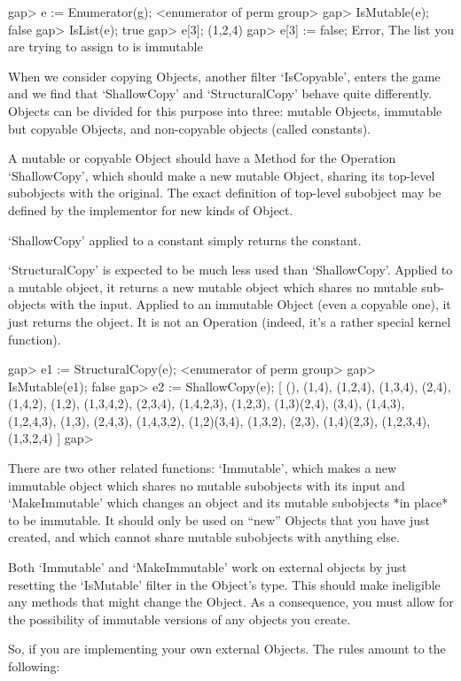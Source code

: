 \beginexample
gap> e := Enumerator(g);
<enumerator of perm group>
gap> IsMutable(e);
false
gap> IsList(e);
true
gap> e[3];
(1,2,4)
gap> e[3] := false;
Error, The list you are trying to assign to is immutable
\endexample

When we consider copying Objects, another filter `IsCopyable', enters
the game and we find that `ShallowCopy' and `StructuralCopy' behave quite
differently. Objects can be divided for this purpose into three:
mutable Objects, immutable but copyable Objects, and non-copyable
objects (called constants).

A mutable or copyable  Object should have a Method for the Operation
`ShallowCopy', which should make a new mutable Object, sharing its top-level
subobjects with the original. The exact definition of top-level subobject may
be defined by the implementor for new kinds of Object.

`ShallowCopy' applied to a constant simply returns the constant.

`StructuralCopy' is expected to be much less used than
`ShallowCopy'. Applied to a mutable object, it returns a new mutable
object which shares no mutable sub-objects with the input. Applied to
an immutable Object (even a copyable one), it just returns the
object. It is not an Operation (indeed, it's a rather special kernel
function).

\beginexample
gap> e1 := StructuralCopy(e);
<enumerator of perm group>
gap> IsMutable(e1);
false
gap> e2 := ShallowCopy(e);
[ (), (1,4), (1,2,4), (1,3,4), (2,4), (1,4,2), (1,2), (1,3,4,2), (2,3,4), 
  (1,4,2,3), (1,2,3), (1,3)(2,4), (3,4), (1,4,3), (1,2,4,3), (1,3), (2,4,3), 
  (1,4,3,2), (1,2)(3,4), (1,3,2), (2,3), (1,4)(2,3), (1,2,3,4), (1,3,2,4) ]
gap> 
\endexample

There are two other related functions: `Immutable', which makes a new
immutable object which shares no mutable subobjects with its input and
`MakeImmutable' which changes an object and its mutable subobjects *in
place* to be immutable. It should only be used on ``new'' Objects that
you have just created, and which cannot share mutable subobjects with
anything else.

Both `Immutable' and `MakeImmutable' work on external objects by just
resetting the `IsMutable' filter in the Object's type. This should make
ineligible any methods that might change the Object. As a consequence,
you must allow for the possibility of immutable versions of any
objects you create.

So, if you are implementing your own external Objects. The rules amount to the
following:

